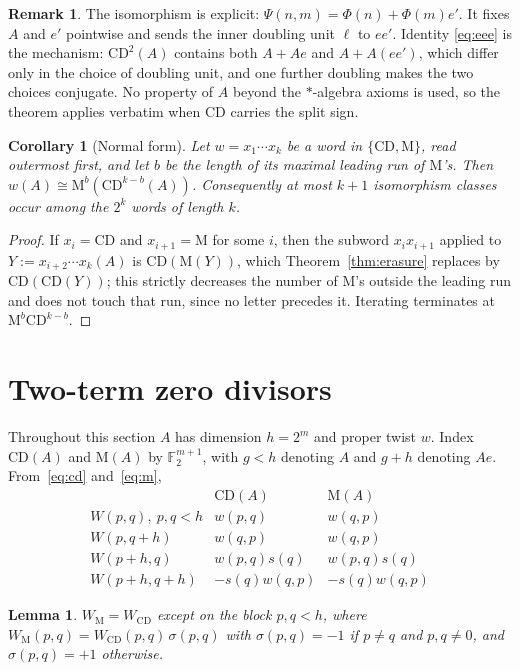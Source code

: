 \documentclass[11pt]{amsart}
\theoremstyle{plain}
\newtheorem{lemma}[theorem]{Lemma}
\newtheorem{corollary}[theorem]{Corollary}
\theoremstyle{definition}
\newtheorem{remark}[theorem]{Remark}
\newcommand{\CD}{\mathrm{CD}}
\newcommand{\MM}{\mathrm{M}}
\newcommand{\FF}{\mathbb{F}}
\begin{document}
\begin{remark}
The isomorphism is explicit: $\Psi(n,m)=\Phi(n)+\Phi(m)e'$. It fixes $A$ and
$e'$ pointwise and sends the inner doubling unit $\ell$ to $ee'$. Identity
\eqref{eq:eee} is the mechanism: $\CD^{2}(A)$ contains both $A+Ae$ and
$A+A(ee')$, which differ only in the choice of doubling unit, and one further
doubling makes the two choices conjugate. No property of $A$ beyond the
$*$-algebra axioms is used, so the theorem applies verbatim when $\CD$ carries
the split sign.
\end{remark}

\begin{corollary}[Normal form]\label{cor:normal}
Let $w=x_1\cdots x_k$ be a word in $\{\CD,\MM\}$, read outermost first, and let
$b$ be the length of its maximal leading run of $\MM$'s. Then
$w(A)\cong\MM^{b}(\CD^{k-b}(A))$. Consequently at most $k+1$ isomorphism classes
occur among the $2^{k}$ words of length $k$.
\end{corollary}

\begin{proof}
If $x_i=\CD$ and $x_{i+1}=\MM$ for some $i$, then the subword
$x_i x_{i+1}$ applied to $Y:=x_{i+2}\cdots x_k(A)$ is $\CD(\MM(Y))$, which
Theorem~\ref{thm:erasure} replaces by $\CD(\CD(Y))$; this strictly decreases the
number of $\MM$'s outside the leading run and does not touch that run, since no
letter precedes it. Iterating terminates at $\MM^{b}\CD^{k-b}$.
\end{proof}

\section{Two-term zero divisors}\label{sec:incr}

Throughout this section $A$ has dimension $h=2^{m}$ and proper twist $w$. Index
$\CD(A)$ and $\MM(A)$ by $\FF_2^{m+1}$, with $g<h$ denoting $A$ and $g+h$
denoting $Ae$. From~\eqref{eq:cd} and~\eqref{eq:m},
\[
\begin{array}{l|cc}
 & \CD(A) & \MM(A)\\\hline
 W(p,q),\ p,q<h & w(p,q) & w(q,p)\\
 W(p,q+h) & w(q,p) & w(q,p)\\
 W(p+h,q) & w(p,q)s(q) & w(p,q)s(q)\\
 W(p+h,q+h) & -s(q)w(q,p) & -s(q)w(q,p)
\end{array}
\]

\begin{lemma}\label{lem:L1}
$W_{\MM}=W_{\CD}$ except on the block $p,q<h$, where
$W_{\MM}(p,q)=W_{\CD}(p,q)\,\sigma(p,q)$ with $\sigma(p,q)=-1$ if $p\neq q$ and
$p,q\neq0$, and $\sigma(p,q)=+1$ otherwise.
\end{lemma}
\end{document}
